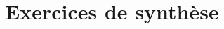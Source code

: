 \documentclass[11pt,fleqn, openany]{book} %
\begin{document}
%


\section*{Exercices de synthèse}
\end{document}
